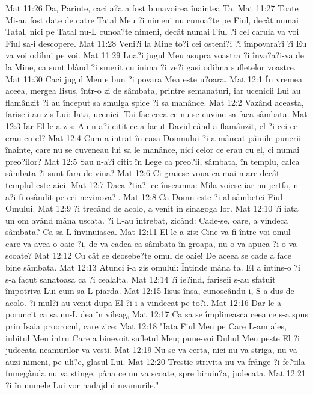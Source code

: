 Mat 11:26  Da, Parinte, caci a?a a fost bunavoirea înaintea Ta.
Mat 11:27  Toate Mi-au fost date de catre Tatal Meu ?i nimeni nu cunoa?te pe Fiul, decât numai Tatal, nici pe Tatal nu-L cunoa?te nimeni, decât numai Fiul ?i cel caruia va voi Fiul sa-i descopere.
Mat 11:28  Veni?i la Mine to?i cei osteni?i ?i împovara?i ?i Eu va voi odihni pe voi.
Mat 11:29  Lua?i jugul Meu asupra voastra ?i înva?a?i-va de la Mine, ca sunt blând ?i smerit cu inima ?i ve?i gasi odihna sufletelor voastre.
Mat 11:30  Caci jugul Meu e bun ?i povara Mea este u?oara.
Mat 12:1  În vremea aceea, mergea Iisus, într-o zi de sâmbata, printre semanaturi, iar ucenicii Lui au flamânzit ?i au început sa smulga spice ?i sa manânce.
Mat 12:2  Vazând aceasta, fariseii au zis Lui: Iata, ucenicii Tai fac ceea ce nu se cuvine sa faca sâmbata.
Mat 12:3  Iar El le-a zis: Au n-a?i citit ce-a facut David când a flamânzit, el ?i cei ce erau cu el?
Mat 12:4  Cum a intrat în casa Domnului ?i a mâncat pâinile punerii înainte, care nu se cuveneau lui sa le manânce, nici celor ce erau cu el, ci numai preo?ilor?
Mat 12:5  Sau n-a?i citit în Lege ca preo?ii, sâmbata, în templu, calca sâmbata ?i sunt fara de vina?
Mat 12:6  Ci graiesc voua ca mai mare decât templul este aici.
Mat 12:7  Daca ?tia?i ce înseamna: Mila voiesc iar nu jertfa, n-a?i fi osândit pe cei nevinova?i.
Mat 12:8  Ca Domn este ?i al sâmbetei Fiul Omului.
Mat 12:9  ?i trecând de acolo, a venit în sinagoga lor.
Mat 12:10  ?i iata un om având mâna uscata. ?i L-au întrebat, zicând: Cade-se, oare, a vindeca sâmbata? Ca sa-L învinuiasca.
Mat 12:11  El le-a zis: Cine va fi între voi omul care va avea o oaie ?i, de va cadea ea sâmbata în groapa, nu o va apuca ?i o va scoate?
Mat 12:12  Cu cât se deosebe?te omul de oaie! De aceea se cade a face bine sâmbata.
Mat 12:13  Atunci i-a zis omului: Întinde mâna ta. El a întins-o ?i s-a facut sanatoasa ca ?i cealalta.
Mat 12:14  ?i ie?ind, fariseii s-au sfatuit împotriva Lui cum sa-L piarda.
Mat 12:15  Iisus însa, cunoscându-i, S-a dus de acolo. ?i mul?i au venit dupa El ?i i-a vindecat pe to?i.
Mat 12:16  Dar le-a poruncit ca sa nu-L dea în vileag,
Mat 12:17  Ca sa se împlineasca ceea ce s-a spus prin Isaia proorocul, care zice:
Mat 12:18  "Iata Fiul Meu pe Care L-am ales, iubitul Meu întru Care a binevoit sufletul Meu; pune-voi Duhul Meu peste El ?i judecata neamurilor va vesti.
Mat 12:19  Nu se va certa, nici nu va striga, nu va auzi nimeni, pe uli?e, glasul Lui.
Mat 12:20  Trestie strivita nu va frânge ?i fe?tila fumegânda nu va stinge, pâna ce nu va scoate, spre biruin?a, judecata.
Mat 12:21  ?i în numele Lui vor nadajdui neamurile."
